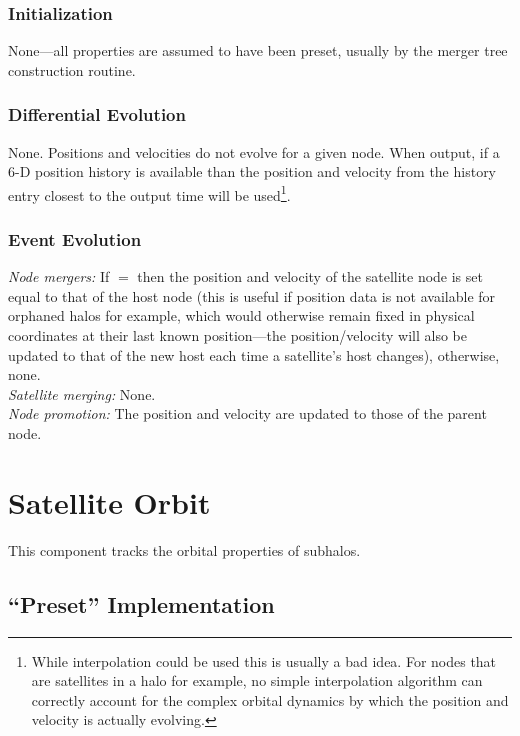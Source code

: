 \subsubsection{Initialization}

None---all properties are assumed to have been preset, usually by the merger tree construction routine.

\subsubsection{Differential Evolution}

None. Positions and velocities do not evolve for a given node. When output, if a 6-D position history is available than the position and velocity from the history entry closest to the output time will be used\footnote{While interpolation could be used this is usually a bad idea. For nodes that are satellites in a halo for example, no simple interpolation algorithm can correctly account for the complex orbital dynamics by which the position and velocity is actually evolving.}.

\subsubsection{Event Evolution}

\noindent\emph{Node mergers:} If $=$ then the position and velocity of the satellite node is set equal to that of the host node (this is useful if position data is not available for orphaned halos for example, which would otherwise remain fixed in physical coordinates at their last known position---the position/velocity will also be updated to that of the new host each time a satellite's host changes), otherwise, none.\\

\noindent\emph{Satellite merging:} None.\\

\noindent\emph{Node promotion:} The position and velocity are updated to those of the parent node.\\

\section{Satellite Orbit}

This \gls{component} tracks the orbital properties of subhalos.

\subsection{``Preset'' Implementation}

